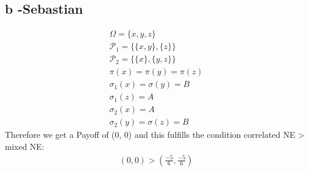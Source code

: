 \documentclass[a4paper,
  twoside, %
  headlines=2.1 %
  ]{scrartcl}
\begin{document}
\subsection*{b -Sebastian}
\begin{align}
    \Omega = \lbrace x,y,z\rbrace\\
    \mathscr{P}_1=\lbrace \lbrace x,y\rbrace,\lbrace z\rbrace \rbrace\\
    \mathscr{P}_2=\lbrace \lbrace x \rbrace,\lbrace y,z\rbrace \rbrace\\
    \pi(x)=\pi(y)=\pi(z)\\
    \sigma_1(x)=\sigma(y)=B\\
    \sigma_1(z)=A\\
    \sigma_2(x)=A\\
    \sigma_2(y)=\sigma(z)=B
\end{align}
Therefore we get a Payoff of (0, 0) and this fulfills the condition correlated NE > mixed NE: \begin{align}
     (0,0)>(\frac{-5}{6}, \frac{-5}{6})
\end{align}
\end{document}
